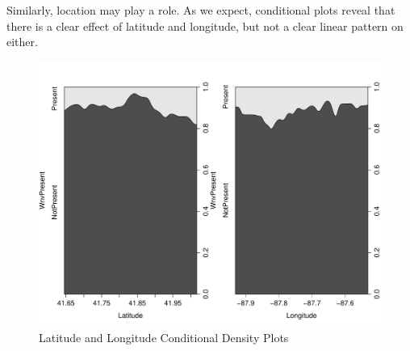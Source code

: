 \documentclass[12pt]{article}
\begin{document}
Similarly, location may play a role. As we expect, conditional plots reveal that there is a clear effect of  latitude and longitude, but not a clear linear pattern on either. 
\begin{figure}[H] \center
\includegraphics[scale=.30]{CD_LatLong.pdf}
\caption*{Latitude and Longitude Conditional Density Plots}
\end{figure}
\end{document}

